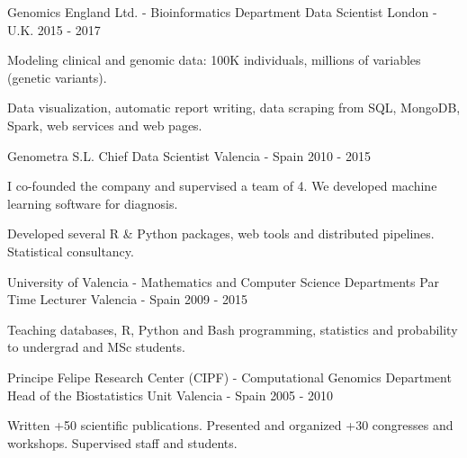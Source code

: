 \begin{cventries}
\cventry
{Genomics England Ltd. - Bioinformatics Department} %
{Data Scientist} %
{London - U.K.} %
{2015 - 2017} %
{ %
\begin{cvitems}
\item {Modeling clinical and genomic data: 100K individuals, millions of variables (genetic variants).}
\item {Data visualization, automatic report writing, data scraping from SQL, MongoDB, Spark, web services and web pages.}
\end{cvitems}
}


\cventry
{Genometra S.L.} %
{Chief Data Scientist} %
{Valencia - Spain} %
{2010 - 2015} %
{ %
\begin{cvitems}
\item {I co-founded the company and supervised a team of 4. We developed machine learning software for diagnosis.}
\item {Developed several R \& Python packages, web tools and distributed pipelines. Statistical consultancy.}
\end{cvitems} 
}


\cventry
{University of Valencia - Mathematics and Computer Science Departments} %
{Par Time Lecturer} %
{Valencia - Spain} %
{2009 - 2015} %
{ %
\begin{cvitems}
\item {Teaching databases, R, Python and Bash programming, statistics and probability to undergrad and MSc students.}
\end{cvitems} 
}


\cventry
{Principe Felipe Research Center (CIPF) - Computational Genomics Department} %
{Head of the Biostatistics Unit} %
{Valencia - Spain} %
{2005 - 2010} %
{ %
\begin{cvitems}
\item {Written +50 scientific publications. Presented and organized +30 congresses and workshops. Supervised staff and students.}
\end{cvitems} 
}


\end{cventries}
